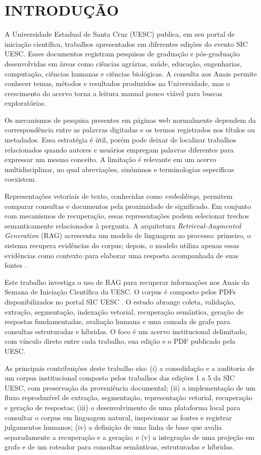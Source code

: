 \chapter{INTRODUÇÃO}

A Universidade Estadual de Santa Cruz (UESC) publica, em seu portal de iniciação científica, trabalhos apresentados em diferentes edições do evento SIC UESC. Esses documentos registram pesquisas de graduação e pós-graduação desenvolvidas em áreas como ciências agrárias, saúde, educação, engenharias, computação, ciências humanas e ciências biológicas. A consulta aos Anais permite conhecer temas, métodos e resultados produzidos na Universidade, mas o crescimento do acervo torna a leitura manual pouco viável para buscas exploratórias.

Os mecanismos de pesquisa presentes em páginas web normalmente dependem da correspondência entre as palavras digitadas e os termos registrados nos títulos ou metadados. Essa estratégia é útil, porém pode deixar de localizar trabalhos relacionados quando autores e usuários empregam palavras diferentes para expressar um mesmo conceito. A limitação é relevante em um acervo multidisciplinar, no qual abreviações, sinônimos e terminologias específicas coexistem.

Representações vetoriais de texto, conhecidas como \textit{embeddings}, permitem comparar consultas e documentos pela proximidade de significado. Em conjunto com mecanismos de recuperação, essas representações podem selecionar trechos semanticamente relacionados à pergunta. A arquitetura \textit{Retrieval-Augmented Generation} (RAG) acrescenta um modelo de linguagem ao processo: primeiro, o sistema recupera evidências do corpus; depois, o modelo utiliza apenas essas evidências como contexto para elaborar uma resposta acompanhada de suas fontes \cite{lewis2020rag,gao2024survey}.

Este trabalho investiga o uso de RAG para recuperar informações nos Anais da Semana de Iniciação Científica da UESC. O corpus é composto pelos PDFs disponibilizados no portal SIC UESC \cite{sicuescanais}. O estudo abrange coleta, validação, extração, segmentação, indexação vetorial, recuperação semântica, geração de respostas fundamentadas, avaliação humana e uma camada de grafo para consultas estruturadas e híbridas. O foco é um acervo institucional delimitado, com vínculo direto entre cada trabalho, sua edição e o PDF publicado pela UESC.

As principais contribuições deste trabalho são: (i) a consolidação e a auditoria de um corpus institucional composto pelos trabalhos das edições 1 a 5 da SIC UESC, com preservação da proveniência documental; (ii) a implementação de um fluxo reproduzível de extração, segmentação, representação vetorial, recuperação e geração de respostas; (iii) o desenvolvimento de uma plataforma local para consultar o corpus em linguagem natural, inspecionar as fontes e registrar julgamentos humanos; (iv) a definição de uma linha de base que avalia separadamente a recuperação e a geração; e (v) a integração de uma projeção em grafo e de um roteador para consultas semânticas, estruturadas e híbridas.

